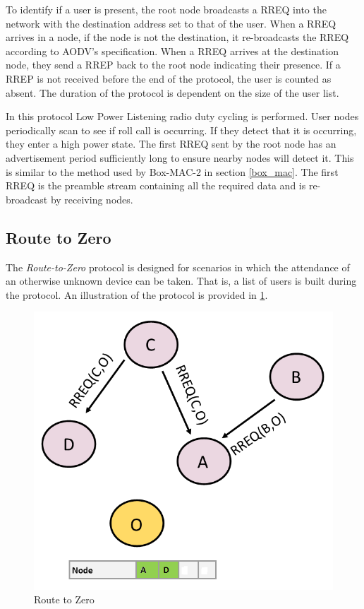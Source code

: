     To identify if a user is present, the root node broadcasts a RREQ into the
    network with the destination address set to that of the user. When a RREQ
    arrives in a node, if the node is not the destination, it re-broadcasts
    the RREQ according to AODV's specification. When a RREQ arrives at the
    destination node, they send a RREP back to the root node indicating their
    presence. If a RREP is not received before the end of the protocol, the user
    is counted as absent. The duration of the protocol is dependent on the size
    of the user list.

    In this protocol Low Power Listening radio duty cycling is performed.
    User nodes periodically scan to see if roll call is occurring. If they
    detect that it is occurring, they enter a high power state. The first
    RREQ sent by the root node has an advertisement period sufficiently long to
    ensure nearby nodes will detect it. This is similar to the method used by
    Box-MAC-2 in section \ref{box_mac}. The first RREQ is the preamble stream containing all
    the required data and is re-broadcast by receiving nodes.

      \subsection{Route to Zero}
    The \textit{Route-to-Zero} protocol is designed for scenarios in which the attendance
    of an otherwise unknown device can be taken. That is, a list of users is
    built during the protocol. An illustration of the protocol is provided in
    \ref{fig:route_to_zero}.

    \FloatBarrier
    \begin{figure}[ht]
      \includegraphics[scale=0.5]{Images/chapter3/route_to_zero.png}
      \caption{Route to Zero}
      \label{fig:route_to_zero}
    \end{figure}
    \FloatBarrier


